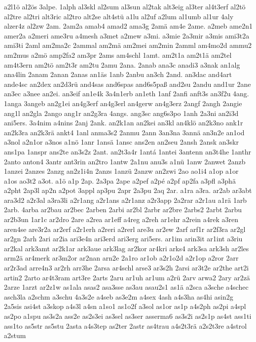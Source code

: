 {a2l1ö
al2ös
3alpe.
1alph
al3skl
al2sum
al3sun
al2tak
alt3eig
al3ter
al4t3erf
al2tö
al2tre
al2tri
alt3ric
al2tro
alt2se
alt4stü
a1lu
al2uf
a2lum
al1umb
al1ur
4aly
alzer4z
al2zw
2am.
2am2a
amab4
amad2
ama3g
2amä
am4e
2ame.
a2meb
ame2n1
amer2a
a2meri
ame3ru
a4mesh
a3met
a2mew
a3mi.
a3mie
2a3mir
a3mis
ami3t2a
ami3ti
2aml
am2ma2c
2ammal
am2mä
am2mei
am2min
2amml
am4mo2d
ammu2
am2mus
a2mö
amp2fa2
am3pr
2ams
am4schl
1amt.
am2t1a
am2t1ä
am2tel
am4t3ern
am2tö
am2t3r
am2tu
2amu
2ana.
2anab
ana3c
anadi3
a3nak
an1alg
ana4lin
2anam
2anan
2anas
an1äs
1anb
2anbu
an3ch
2and.
an3dac
and4art
ande4sc
an2dex
an2d3rü
and4sas
and6spas
and6s5paß
and2su
2andu
and1ur
2ane
an3ec
a3nee
an2ei.
an3eif
an1e4k
3a4n1erb
an1eth
1anf
2anfi
anft3s
an3f2u
4ang.
1anga
3angeb
an2g1ei
an4g3erf
an4g3erl
an4gerw
an4g3erz
2angf
2angh
2angie
ang1l
an2gla
2ango
ang1r
an2g3ra
4angs.
ang3sc
ang6s3po
1anh
2a3ni
an2i3d
ani5ers.
3a4nim
a4nins
2anj
2ank.
an2k1an
an2kei
an3kl
an4klö
an2k3no
ank1r
an2k3ra
an2k3rä
ankt4
1anl
anma3s2
2anmu
2ann
3an3na
3annä
an3n2e
an1od
a3nol
a2n1or
a3nos
a1nö
1anr
1ansä
1ansc
ans2en
an2seu
2ansh
2ansk
an3skr
ans1pa
1anspr
ans2te
an3s2z
2ant.
an2t3a4r
1antá
1antei
3antenn
an3t4he
1anthr
2anto
anton4
3antr
ant3rin
an2tro
1antw
2a1nu
anu3s
a1nü
1anw
2anwet
2anzb
1anzei
2anzes
2anzg
an2z1i4n
2anzs
1anzü
2anzw
an2zwi
2ao
ao1i4
a1op
a1or
a1os
ao3t2
a3ot.
a1ö
a1p
2ap.
2a3pa
2ape
a2pef
a2pé
a2pf
ap2fa
a3pfl
a3phä
a2pht
2ap3l
ap2n
a2pot
3appl
ap3pu
2apr
2a3pu
2aq
2ar.
a1ra
a3ra.
ar2ab
ar3abt
ara3d2
a2r3al
a3ra3li
a2r1ang
a2r1ans
a2r1anz
a2r3app
2a2rar
a2r1au
a1rä
1arb
2arb.
4arba
ar2bau
ar2bec
2arben
2arbi
ar2bl
2arbr
ar2bre
2arbs2
2arbt
2arbu
ar2b3un
1ar1c
ar2dro
2are
a2rea
ar1eff
a4reg
a2reh
ar1ehr
a2rein
a4rek
a3ren
aren4se
are3r2a
ar2erf
a2r1erh
a2reri
a2rerl
are3u
ar2ew
2arf
arf1r
ar2f3ra
ar2gl
ar2gn
2arh
2ari
ar2ia
ari3e4n
ari3erd
ari3erg
ari5ers.
ar1im
arin3it
ar1int
a3riu
ar2kal
ark3amt
ar2k1ar
ark3aue
ark3lag
ar2kor
ar4kri
arks4
ark3sa
ark3sh
ar2les
arm2ä
ar4merk
ar3m2or
ar2nan
arn2e
2a1ro
ar1ob
a2r1o2d
a2r1op
a2ror
2arr
ar2r3ad
arre4n3
ar2rh
arr3he
2arsa
ar4schl
arse3
ar3s2h
2arsi
ar3t2e
ar2the
art2i
artin2
2arto
ar4t3ram
art3re
2arts
2aru
ar1uh
ar1um
a2rü
2arv
arwa2
2ary
ar2zä
2arze
1arzt
ar2z1w
as1ala
asas2
asa3sse
as3au
asau2s1
as1ä
a2sca
a3sche
a4schec
asch3la
a2schm
a3schu
4a3s2e
a4seb
as3e2m
a4sex
4ash
a4s3ha
as4hi
asin2g
2a5sis
asi4st
a3skop
a4s3l
a4sn
a1so1
as1o2f
a3sol
as1or
as1p
a4s2ph
as2pi
a4spl
as2po
a1spu
as3s2a
ass2e
as2s3ei
as3sel
as3ser
asserma6
as3s2i
as2s1p
as4st
ass1ti
ass1to
as5str
as5stu
2asta
a4s3tep
as2ter
2astr
as4trau
a4s2t3rä
a2s2t3re
a4strol
a2stum
}
